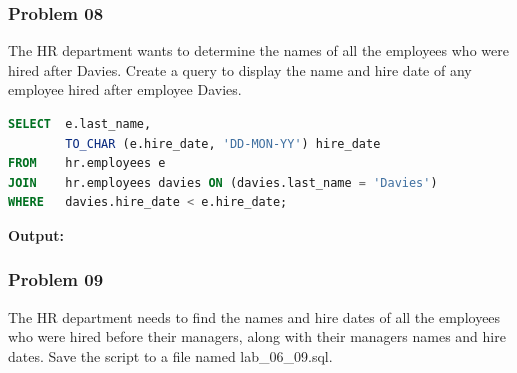 \subsubsection*{Problem 08}
The HR department wants to determine the names of all the employees who were hired after Davies. Create a query to display the name and hire date of any employee hired after employee Davies.
\begin{frame}



\begin{lstlisting}[language=SQL]
SELECT 	e.last_name,
       	TO_CHAR (e.hire_date, 'DD-MON-YY') hire_date
FROM 	hr.employees e
JOIN 	hr.employees davies ON (davies.last_name = 'Davies')
WHERE 	davies.hire_date < e.hire_date;
\end{lstlisting}
\textbf{Output: }
\end{frame}


\newpage
\subsubsection*{Problem 09}
The HR department needs to find the names and hire dates of all the employees who were hired before their managers, along with their managers names and hire dates. Save the script to a file named lab\_06\_09.sql.

